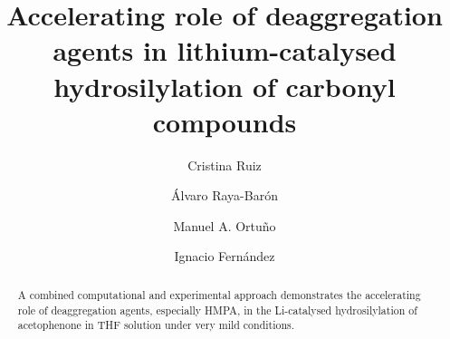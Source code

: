 \documentclass{article}
\begin{document}
\marginsize{2cm}{2cm}{2cm}{2cm}

\author{Cristina Ruiz}

\author{Álvaro Raya-Barón}

\author{Manuel A. Ortuño}

\author{Ignacio Fernández}

\title{Accelerating role of deaggregation agents in lithium-catalysed hydrosilylation of carbonyl compounds} %
\maketitle



	
	\begin{abstract}
		A combined computational and experimental approach demonstrates the accelerating role of deaggregation agents, especially HMPA, in the Li-catalysed hydrosilylation of acetophenone in THF solution under very mild conditions.
	\end{abstract}
	
	
\end{document}
